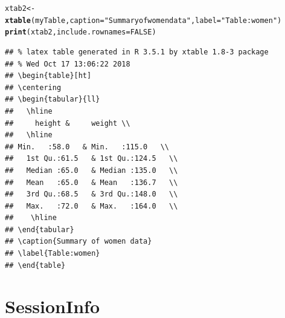 \documentclass{article}\usepackage[]{graphicx}\usepackage[]{color}
\makeatletter
\newcommand{\hlnum}[1]{\textcolor[rgb]{0.686,0.059,0.569}{#1}}%
\newcommand{\hlstr}[1]{\textcolor[rgb]{0.192,0.494,0.8}{#1}}%
\newcommand{\hlstd}[1]{\textcolor[rgb]{0.345,0.345,0.345}{#1}}%
\newcommand{\hlkwb}[1]{\textcolor[rgb]{0.69,0.353,0.396}{#1}}%
\newcommand{\hlkwc}[1]{\textcolor[rgb]{0.333,0.667,0.333}{#1}}%
\newcommand{\hlkwd}[1]{\textcolor[rgb]{0.737,0.353,0.396}{\textbf{#1}}}%
\newenvironment{kframe}{%
 \def\at@end@of@kframe{}%
 \ifinner\ifhmode%
  \def\at@end@of@kframe{\end{minipage}}%
  \begin{minipage}{\columnwidth}%
 \fi\fi%
 \def\FrameCommand##1{\hskip\@totalleftmargin \hskip-\fboxsep
 \colorbox{shadecolor}{##1}\hskip-\fboxsep
     \hskip-\linewidth \hskip-\@totalleftmargin \hskip\columnwidth}%
 \MakeFramed {\advance\hsize-\width
   \@totalleftmargin\z@ \linewidth\hsize
   \@setminipage}}%
 {\par\unskip\endMakeFramed%
 \at@end@of@kframe}
\newenvironment{knitrout}{}{} %
\makeatother
\begin{document}
\begin{knitrout}
\color{fgcolor}\begin{kframe}
\begin{alltt}
\hlstd{xtab2}\hlkwb{<-}\hlkwd{xtable}\hlstd{(myTable,} \hlkwc{caption}\hlstd{=}\hlstr{"Summary of women data"}\hlstd{,}  \hlkwc{label}\hlstd{=}\hlstr{"Table:women"}\hlstd{)}
\hlkwd{print}\hlstd{(xtab2,}\hlkwc{include.rownames} \hlstd{=} \hlnum{FALSE}\hlstd{)}
\end{alltt}
\begin{verbatim}
## % latex table generated in R 3.5.1 by xtable 1.8-3 package
## % Wed Oct 17 13:06:22 2018
## \begin{table}[ht]
## \centering
## \begin{tabular}{ll}
##   \hline
##     height &     weight \\ 
##   \hline
## Min.   :58.0   & Min.   :115.0   \\ 
##   1st Qu.:61.5   & 1st Qu.:124.5   \\ 
##   Median :65.0   & Median :135.0   \\ 
##   Mean   :65.0   & Mean   :136.7   \\ 
##   3rd Qu.:68.5   & 3rd Qu.:148.0   \\ 
##   Max.   :72.0   & Max.   :164.0   \\ 
##    \hline
## \end{tabular}
## \caption{Summary of women data} 
## \label{Table:women}
## \end{table}
\end{verbatim}
\end{kframe}
\end{knitrout}

\newpage
\section{SessionInfo}
\end{document}
